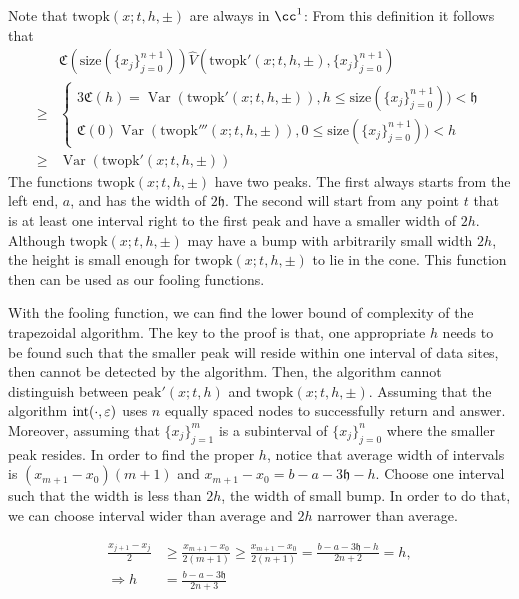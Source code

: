 \documentclass{iitthesis}
\DeclareMathOperator{\Var}{Var}
\theoremstyle{definition}
\theoremstyle{remark}
\begin{document}
Note that $\text{twopk}(x;t,h,\pm)$ are always in $\cc^1$:
From this definition it follows that
\begin{align*}
  &\mathfrak{C}(\text{size}(\{x_j\}_{j=0}^{n+1}))\widehat{V}(\text{twopk}'(x;t,h,\pm),\{x_j\}_{j=0}^{n+1})\\
  \ge & \begin{cases} \displaystyle 3\mathfrak{C}(h)=\Var(\text{twopk}'(x;t,h,\pm)), h \le \text{size}(\{x_j\}_{j=0}^{n+1})) <\mathfrak{h}\\[1ex]
                      \displaystyle \mathfrak{C}(0)\Var(\text{twopk}'''(x;t,h,\pm)), 0\le \text{size}(\{x_j\}_{j=0}^{n+1}))<h
        \end{cases}\\
  \ge & \Var(\text{twopk}'(x;t,h,\pm))
\end{align*}
The functions $\text{twopk}(x;t,h,\pm)$ have two peaks. The first always starts from the left end, $a$, and has the width of $2\mathfrak{h}$. The second will start from any point $t$ that is at least one interval right to the first peak and have a smaller width of $2h$. Although $\text{twopk}(x;t,h,\pm)$ may have a bump with arbitrarily small width $2h$, the height is small enough for $\text{twopk}(x;t,h,\pm)$ to lie in the cone. This function then can be used as our fooling functions. 

With the fooling function, we can find the lower bound of complexity of the trapezoidal algorithm. The key to the proof is that, one appropriate $h$ needs to be found such that the smaller peak will reside within one interval of data sites, then cannot be detected by the algorithm. Then, the algorithm cannot distinguish between $\text{peak}'(x;t,h)$ and $\text{twopk}(x;t,h,\pm)$. Assuming that the algorithm $\textup{int}(\cdot,\varepsilon)$ uses $n$ equally spaced nodes to successfully return and answer. Moreover, assuming that $\{x_{j}\}_{j=1}^{m}$ is a subinterval of $\{x_{j}\}_{j=0}^{n}$ where the smaller peak resides. In order to find the proper $h$, notice that average width of intervals is $(x_{m+1}-x_{0})(m+1)$ and $x_{m+1}-x_{0}=b-a-3\mathfrak{h}-h$. Choose one interval such that the width is less than $2h$, the width of small bump. In order to do that, we can choose interval wider than average and $2h$ narrower than average.

  \begin{align*}
    \frac{x_{j+1}-x_{j}}{2}&\ge\frac{x_{m+1}-x_{0}}{2(m+1)}\ge\frac{x_{m+1}-x_{0}}{2(n+1)}=\frac{b-a-3\mathfrak{h}-h}{2n+2}=h,\\
    \Rightarrow h&=\frac{b-a-3\mathfrak{h}}{2n+3}
  \end{align*}
\end{document}
